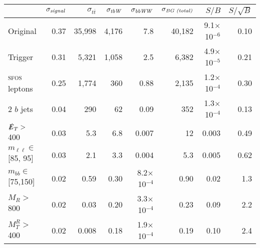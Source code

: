 \begin{tabular}{lrrrrrrr}
\toprule
{} &  $\sigma_\text{\emph{signal}}$ &  $\sigma_{t\overline{t}}$ &  $\sigma_\text{\emph{tbW}}$ &  $\sigma_\text{\emph{bbWW}}$ &  $\sigma_\text{\emph{BG (total)}}$ &   $S/B$ &  $S/\sqrt{B}$ \\
\midrule
Original            & 0.37 & 35,998 & 4,176 & 7.8     & 40,182 & 9.1$\times$ 10$^{-6}$ & 0.10 \\
Trigger             & 0.31 & 5,321  & 1,058 & 2.5     & 6,382  & 4.9$\times$ 10$^{-5}$ & 0.21 \\
\textsc{sfos} leptons        & 0.25 & 1,774  & 360   & 0.88    & 2,135  & 1.2$\times$ 10$^{-4}$ & 0.30 \\
2 $b$ jets          & 0.04 & 290    & 62    & 0.09    & 352    & 1.3$\times$ 10$^{-4}$ & 0.13 \\
$\slashed{E}_T >$ 400         & 0.03 & 5.3    & 6.8   & 0.007   & 12     & 0.003               & 0.49 \\
$m_{\ell\ell} \in$ [85, 95]  & 0.03 & 2.1    & 3.3   & 0.004   & 5.3    & 0.005               & 0.62 \\
$m_{bb}\in$ [75,150] & 0.02 & 0.59   & 0.30  & 8.2$\times$ 10$^{-4}$ & 0.90   & 0.02                & 1.3 \\
$M_{R} >$ 800       & 0.02 & 0.03   & 0.20  & 3.3$\times$ 10$^{-4}$ & 0.23   & 0.09                & 2.2 \\
$M_{T}^{R} >$ 400   & 0.02 & 0.008  & 0.18  & 1.9$\times$ 10$^{-4}$ & 0.19   & 0.10                & 2.4 \\
\bottomrule
\end{tabular}
